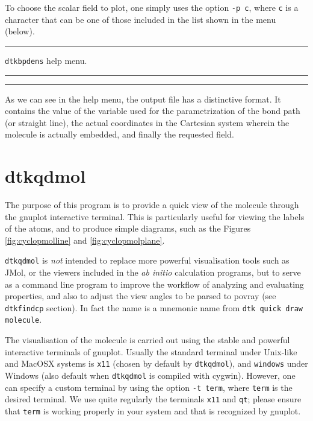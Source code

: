 To choose the scalar field to plot, one simply uses the option \texttt{-p c}, where
\texttt{c} is a character that can be one of those included in the list shown in the menu (below).

\rule{\textwidth}{1pt}
{\center\texttt{dtkbpdens} help menu.\\}
\rule{\textwidth}{1pt}
\begin{footnotesize}
\end{footnotesize}
\rule{\textwidth}{1pt}

As we can see in the help menu, the output file has a distinctive format. It contains the value of the variable used for the parametrization of the bond path (or straight line), the actual coordinates in the Cartesian system wherein the molecule is actually embedded, and finally the requested field.

\section{\label{sec:dtkqdmol}dtkqdmol}

The purpose of this program is to provide a quick view of the molecule through the gnuplot interactive terminal. This is particularly useful for viewing the labels of the atoms, and to produce simple diagrams, such as the Figures \ref{fig:cyclopmolline} and \ref{fig:cyclopmolplane}.

\texttt{dtkqdmol} is \textit{not} intended to replace more powerful visualisation tools such as JMol, or the viewers included in the \textit{ab initio} calculation programs, but to serve as a command line program to improve the workflow of analyzing and evaluating properties, and also to adjust the view angles to be parsed to povray (see \texttt{dtkfindcp} section). In fact the name is a mnemonic name from \texttt{dtk quick draw molecule}.

The visualisation of the molecule is carried out using the stable and powerful interactive terminals of gnuplot. Usually the standard terminal under Unix-like and MacOSX systems is \texttt{x11} (chosen by default by \texttt{dtkqdmol}), and \texttt{windows} under Windows (also default when \texttt{dtkqdmol} is compiled with cygwin). However, one can specify a custom terminal by using the option \texttt{-t term}, where \texttt{term} is the desired terminal. We use quite regularly the terminals \texttt{x11} and \texttt{qt}; please ensure that \texttt{term} is working properly in your system and that is recognized by gnuplot.

